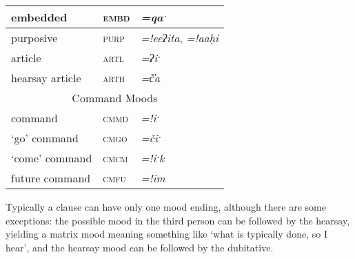 \begin{table}[ht]
\begin{tabular}{lll}
\multicolumn{1}{|l|}{embedded}             & \multicolumn{1}{l|}{\textsc{embd}} & \multicolumn{1}{l|}{\textit{=qaˑ}}              \\ \hline
\multicolumn{1}{|l|}{purposive}            & \multicolumn{1}{l|}{\textsc{purp}} & \multicolumn{1}{l|}{\textit{=!eeʔita}, \textit{=!aaḥi}}  \\ \hline
\multicolumn{1}{|l|}{article\footnotemark}              & \multicolumn{1}{l|}{\textsc{artl}} & \multicolumn{1}{l|}{\textit{=ʔiˑ}}              \\ \hline
\multicolumn{1}{|l|}{hearsay article}      & \multicolumn{1}{l|}{\textsc{arth}} & \multicolumn{1}{l|}{\textit{=č̓a}}             \\ \hline
\multicolumn{3}{|c|}{Command Moods} \\ \hline
\multicolumn{1}{|l|}{command}              & \multicolumn{1}{l|}{\textsc{cmmd}} & \multicolumn{1}{l|}{\textit{=!iˑ}}              \\ \hline
\multicolumn{1}{|l|}{`go' command}         & \multicolumn{1}{l|}{\textsc{cmgo}} & \multicolumn{1}{l|}{\textit{=čiˑ}}             \\ \hline
\multicolumn{1}{|l|}{`come' command}       & \multicolumn{1}{l|}{\textsc{cmcm}} & \multicolumn{1}{l|}{\textit{=!iˑk}}             \\ \hline
\multicolumn{1}{|l|}{future command}       & \multicolumn{1}{l|}{\textsc{cmfu}} & \multicolumn{1}{l|}{\textit{=!im}}              \\ \hline
\end{tabular}
\end{table}

\addtocounter{footnote}{-1}
\addtocounter{footnote}{1}

Typically a clause can have only one mood ending, although there are some exceptions: the possible mood in the third person can be followed by the hearsay, yielding a matrix mood meaning something like `what is typically done, so I hear', and the hearsay mood can be followed by the dubitative.

